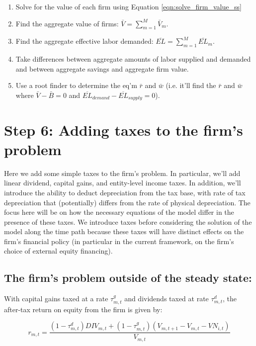 \documentclass[letterpaper,12pt]{article}
\theoremstyle{definition}
\begin{document}
\begin{spacing}{1.5}
\begin{enumerate}
\item Solve for the value of each firm using Equation \ref{eqn:solve_firm_value_ss}
\item Find the aggregate value of firms: $\bar{V} = \sum_{m=1}^{M}\bar{V}_{m}$.
\item Find the aggregate effective labor demanded: $\overline{EL} =\sum_{m=1}^{M} \overline{EL}_{m}$.
\item Take differences between aggregate amounts of labor supplied and demanded and between aggregate savings and aggregate firm value.
\item Use a root finder to determine the eq'm $\bar{r}$ and $\bar{w}$ (i.e. it'll find the $\bar{r}$ and $\bar{w}$ where $\bar{V}-\bar{B}=0$ and $\overline{EL}_{demand}-\overline{EL}_{supply}=0$).
\end{enumerate}


\section*{Step 6: Adding taxes to the firm's problem}

Here we add some simple taxes to the firm's problem.  In particular, we'll add linear dividend, capital gains, and entity-level income taxes.  In addition, we'll introduce the ability to deduct depreciation from the tax base, with rate of tax depreciation that (potentially) differs from the rate of physical depreciation.  The focus here will be on how the necessary equations of the model differ in the presence of these taxes.  We introduce taxes before considering the solution of the model along the time path because these taxes will have distinct effects on the firm's financial policy (in particular in the current framework, on the firm's choice of external equity financing).

\subsection*{The firm's problem outside of the steady state:}

With capital gains taxed at a rate $\tau^{g}_{m,t}$ and dividends taxed at rate $\tau^{d}_{m,t}$, the after-tax return on equity from the firm is given by:


\begin{equation}
r_{m,t} = \frac{(1-\tau^{d}_{m,t})DIV_{m,t}+(1-\tau^{g}_{m,t})(V_{m,t+1}-V_{m,t}-VN_{i,t})}{V_{m,t}}
\end{equation} 


\end{spacing}
\end{document}
